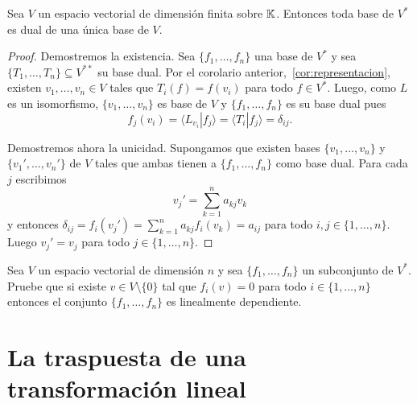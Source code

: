 \begin{cor}
    Sea $V$ un espacio vectorial de dimensión finita sobre $\mathbb{K}$. Entonces toda
    base de $V^*$ es dual de una única base de $V$.

    \begin{proof}
        Demostremos la existencia. Sea $\{f_1,\dots,f_n\}$ una base de $V^*$ y
        sea $\{T_1,\dots,T_n\}\subseteq V^{**}$ su base dual. Por el corolario
        anterior,~\ref{cor:representacion}, existen $v_1,\dots,v_n\in V$ tales
		que $T_i(f)=f(v_i)$ para todo $f\in V^*$. Luego, como $L$ es un
		isomorfismo, $\{v_1,\dots,v_n\}$ es base de $V$ y $\{f_1,\dots,f_n\}$
		es su base dual pues
		\[
			f_j(v_i)=\langle L_{v_i}|f_j\rangle=\langle T_i|f_j\rangle=\delta_{ij}.
		\]

		Demostremos ahora la unicidad. Supongamos que existen bases
		$\{v_1,\dots,v_n\}$ y $\{v_1',\dots,v_n'\}$ de $V$ tales que ambas
		tienen a $\{f_1,\dots,f_n\}$ como base dual. Para cada $j$ escribimos
		\[
			v_j'=\sum_{k=1}^n a_{kj}v_k
		\]
		y entonces $\delta_{ij}=f_i(v_j')=\sum_{k=1}^n a_{kj}f_i(v_k)=a_{ij}$
		para todo $i,j\in\{1,\dots,n\}$. Luego $v_j'=v_j$ para todo
		$j\in\{1,\dots,n\}$.
    \end{proof}
\end{cor}



\begin{xca}
	\label{xca:dual:LI}
	Sea $V$ un espacio vectorial de dimensión $n$ y sea
	$\{f_1,\dots,f_n\}$ un subconjunto de $V^*$. Pruebe que si existe $v\in
	V\setminus\{0\}$ tal que $f_i(v)=0$ para todo $i\in\{1,\dots,n\}$
	entonces el conjunto $\{f_1,\dots,f_n\}$ es linealmente dependiente. 
\end{xca}



\section{La traspuesta de una transformación lineal}


